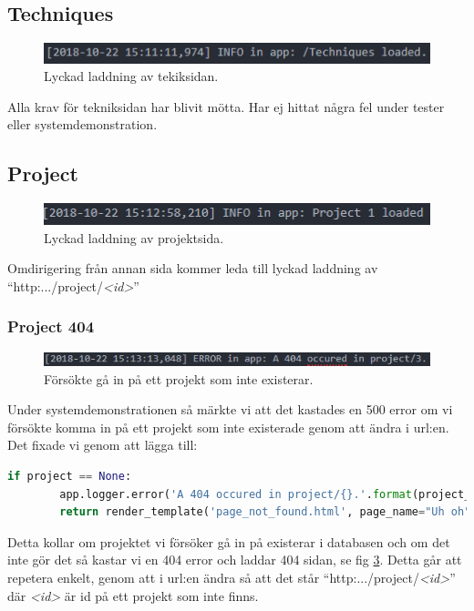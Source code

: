 \documentclass{TDP003mall}
\begin{document}
\subsection{Techniques}
\label{sec:techniques}
\begin{figure}[H]
    \centering
    \includegraphics[width=\linewidth]{ttechniques.png}
    \caption{Lyckad laddning av tekiksidan.}
    \label{fig:techniques}
\end{figure}
Alla krav för tekniksidan har blivit mötta.
Har ej hittat några fel under tester eller systemdemonstration.
\subsection{Project}
\begin{figure}[H]
    \centering
    \includegraphics[width=\linewidth]{projekt.png}
    \caption{Lyckad laddning av projektsida.}
    \label{fig:projekt}
\end{figure}
Omdirigering från annan sida kommer leda till lyckad laddning av \enquote{http:.../project/\textit{<id>}}
\subsubsection{Project 404}
\begin{figure}[H]
    \centering
    \includegraphics[width=\linewidth]{projekt404.png}
    \caption{Försökte gå in på ett projekt som inte existerar.}
    \label{fig:404projekt}
\end{figure}
Under systemdemonstrationen så märkte vi att det kastades en 500 error om vi försökte komma in på ett projekt som inte existerade genom att ändra i url:en. Det fixade vi genom att lägga till:
\begin{lstlisting}[caption={Kollar om projekt existerar.}, language=Python]
if project == None:
        app.logger.error('A 404 occured in project/{}.'.format(project_id))
        return render_template('page_not_found.html', page_name="Uh oh")
\end{lstlisting}
Detta kollar om projektet vi försöker gå in på existerar i databasen och om det inte gör det så kastar vi en 404 error och laddar 404 sidan, se fig \ref{fig:404projekt}. Detta går att repetera enkelt, genom att i url:en ändra så att det står \enquote{http:.../project/\textit{<id>}} där \textit{<id>} är id på ett projekt som inte finns.
\end{document}
